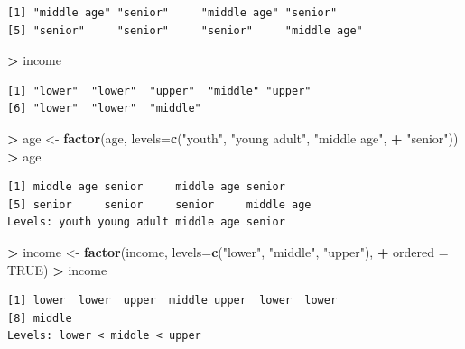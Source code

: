 \documentclass[]{krantz}
\makeatletter
\newenvironment{Shaded}{\begin{snugshade}}{\end{snugshade}}
\newcommand{\DataTypeTok}[1]{\textcolor[rgb]{0.27,0.27,0.27}{#1}}
\newcommand{\KeywordTok}[1]{\textcolor[rgb]{0.27,0.27,0.27}{\textbf{#1}}}
\newcommand{\NormalTok}[1]{#1}
\newcommand{\OperatorTok}[1]{\textcolor[rgb]{0.43,0.43,0.43}{\textbf{#1}}}
\newcommand{\OtherTok}[1]{\textcolor[rgb]{0.37,0.37,0.37}{#1}}
\newcommand{\StringTok}[1]{\textcolor[rgb]{0.5,0.5,0.5}{#1}}
\newenvironment{kframe}{%
\medskip{}
\setlength{\fboxsep}{.8em}
 \def\at@end@of@kframe{}%
 \ifinner\ifhmode%
  \def\at@end@of@kframe{\end{minipage}}%
  \begin{minipage}{\columnwidth}%
 \fi\fi%
 \def\FrameCommand##1{\hskip\@totalleftmargin \hskip-\fboxsep
 \colorbox{shadecolor}{##1}\hskip-\fboxsep
     \hskip-\linewidth \hskip-\@totalleftmargin \hskip\columnwidth}%
 \MakeFramed {\advance\hsize-\width
   \@totalleftmargin\z@ \linewidth\hsize
   \@setminipage}}%
 {\par\unskip\endMakeFramed%
 \at@end@of@kframe}
\renewenvironment{Shaded}{\begin{kframe}}{\end{kframe}}
\makeatother
\begin{document}
\begin{verbatim}
[1] "middle age" "senior"     "middle age" "senior"    
[5] "senior"     "senior"     "senior"     "middle age"
\end{verbatim}

\begin{Shaded}
\begin{Highlighting}[]
\OperatorTok{>}\StringTok{ }\NormalTok{income}
\end{Highlighting}
\end{Shaded}

\begin{verbatim}
[1] "lower"  "lower"  "upper"  "middle" "upper" 
[6] "lower"  "lower"  "middle"
\end{verbatim}

\begin{Shaded}
\begin{Highlighting}[]
\OperatorTok{>}\StringTok{ }\NormalTok{age <-}\StringTok{ }\KeywordTok{factor}\NormalTok{(age, }\DataTypeTok{levels=}\KeywordTok{c}\NormalTok{(}\StringTok{"youth"}\NormalTok{, }\StringTok{"young adult"}\NormalTok{, }\StringTok{"middle age"}\NormalTok{, }
\OperatorTok{+}\StringTok{                             "senior"}\NormalTok{))}
\OperatorTok{>}\StringTok{ }\NormalTok{age}
\end{Highlighting}
\end{Shaded}

\begin{verbatim}
[1] middle age senior     middle age senior    
[5] senior     senior     senior     middle age
Levels: youth young adult middle age senior
\end{verbatim}

\begin{Shaded}
\begin{Highlighting}[]
\OperatorTok{>}\StringTok{ }\NormalTok{income <-}\StringTok{ }\KeywordTok{factor}\NormalTok{(income, }\DataTypeTok{levels=}\KeywordTok{c}\NormalTok{(}\StringTok{"lower"}\NormalTok{, }\StringTok{"middle"}\NormalTok{, }\StringTok{"upper"}\NormalTok{), }
\OperatorTok{+}\StringTok{                  }\DataTypeTok{ordered =} \OtherTok{TRUE}\NormalTok{)}
\OperatorTok{>}\StringTok{ }\NormalTok{income}
\end{Highlighting}
\end{Shaded}

\begin{verbatim}
[1] lower  lower  upper  middle upper  lower  lower 
[8] middle
Levels: lower < middle < upper
\end{verbatim}
\end{document}
